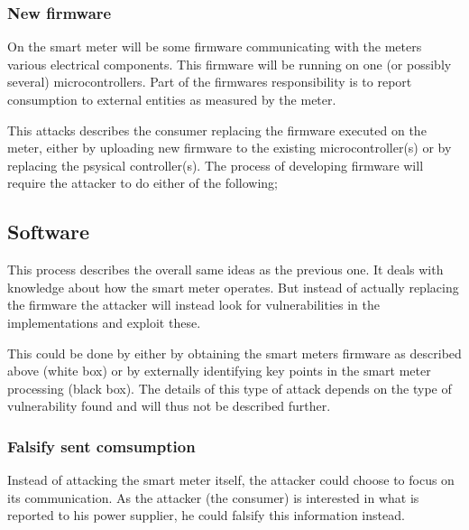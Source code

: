 \subsubsection{New firmware}
On the smart meter will be some firmware communicating with the meters various electrical components.
This firmware will be running on one (or possibly several) microcontrollers.
Part of the firmwares responsibility is to report consumption to external entities as measured by the meter.

This attacks describes the consumer replacing the firmware executed on the meter, either by uploading new firmware to the existing microcontroller(s) or by replacing the psysical controller(s).
The process of developing firmware will require the attacker to do either of the following;

\subsection{Software}
This process describes the overall same ideas as the previous one.
It deals with knowledge about how the smart meter operates.
But instead of actually replacing the firmware the attacker will instead look for vulnerabilities in the implementations and exploit these.

This could be done by either by obtaining the smart meters firmware as described above (white box) or by externally identifying key points in the smart meter processing (black box).
The details of this type of attack depends on the type of vulnerability found and will thus not be described further.

\subsubsection{Falsify sent comsumption}
Instead of attacking the smart meter itself, the attacker could choose to focus on its communication.
As the attacker (the consumer) is interested in what is reported to his power supplier, he could falsify this information instead.


